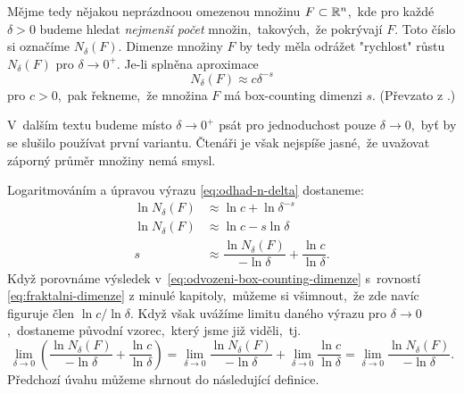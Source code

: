 Mějme tedy nějakou neprázdnoou omezenou množinu $F\subset\mathbb{R}^n$,~kde pro každé $\delta>0$ budeme hledat \emph{nejmenší počet} množin,~takových,~že pokrývají $F$. Toto číslo si označíme $N_\delta(F)$. Dimenze množiny $F$ by tedy měla odrážet "rychlost" růstu $N_\delta(F)$ pro $\delta\to 0^+$. Je-li splněna aproximace
\begin{equation}\label{eq:odhad-n-delta}
    N_\delta(F)\approx c\delta^{-s}
\end{equation}
pro $c>0$,~pak řekneme,~že množina $F$ má box-counting dimenzi $s$. (Převzato z \citep[str. 27]{Falconer2014}.)
\begin{remark}
    V~dalším textu budeme místo $\delta\to 0^+$ psát pro jednoduchost pouze $\delta\to 0$,~byť by se slušilo používat první variantu. Čtenáři je však nejspíše jasné,~že uvažovat záporný průměr množiny nemá smysl.
\end{remark}
Logaritmováním a úpravou výrazu \eqref{eq:odhad-n-delta} dostaneme:
\begin{align}\label{eq:odvozeni-box-counting-dimenze}
    \ln{N_\delta(F)}&\approx\ln{c}+\ln{\delta^{-s}}\\
    \ln{N_\delta(F)}&\approx\ln{c}-s\ln{\delta}\\
    s&\approx\dfrac{\ln{N_\delta(F)}}{-\ln{\delta}}+\dfrac{\ln{c}}{\ln{\delta}}.
\end{align}
Když porovnáme výsledek v~\eqref{eq:odvozeni-box-counting-dimenze} s~rovností \eqref{eq:fraktalni-dimenze} z minulé kapitoly,~můžeme si všimnout,~že zde navíc figuruje člen $\ln{c}/\ln{\delta}$. Když však uvážíme limitu daného výrazu pro $\delta\to 0$,~dostaneme původní vzorec,~který jsme již viděli,~tj.
\[\lim_{\delta\to 0}\left(\dfrac{\ln{N_\delta(F)}}{-\ln{\delta}}+\dfrac{\ln{c}}{\ln{\delta}}\right)=\lim_{\delta\to 0}\dfrac{\ln{N_\delta(F)}}{-\ln{\delta}}+\lim_{\delta\to 0}\dfrac{\ln{c}}{\ln{\delta}}=\lim_{\delta\to 0}\dfrac{\ln{N_\delta(F)}}{-\ln{\delta}}.\]
Předchozí úvahu můžeme shrnout do následující definice.
